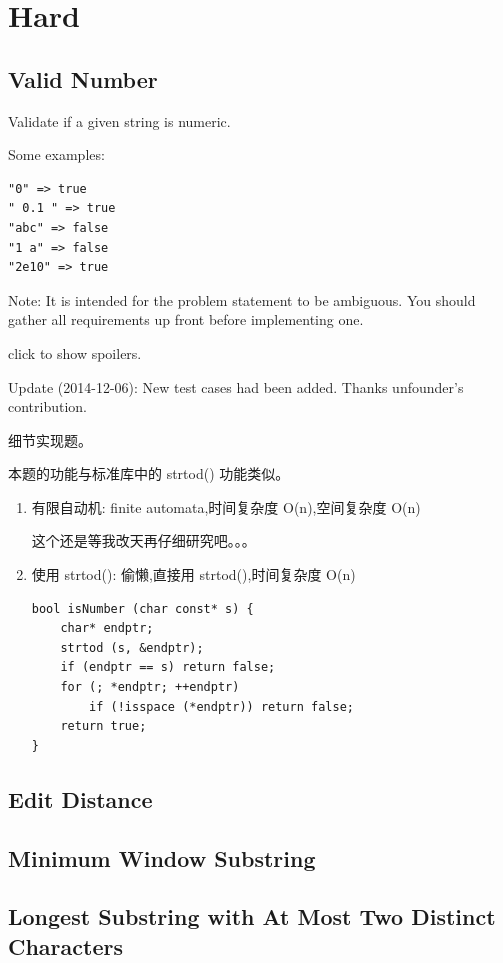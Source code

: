 \documentclass[12pt]{book}
\begin{document}
\section{Hard}
\label{sec-2-3}
\subsection{Valid Number}
\label{sec-2-3-1}
Validate if a given string is numeric.

Some examples:
\lstset{language=java,label= ,caption= ,numbers=none}
\begin{lstlisting}
"0" => true
" 0.1 " => true
"abc" => false
"1 a" => false
"2e10" => true
\end{lstlisting}

Note: It is intended for the problem statement to be ambiguous. You should gather all requirements up front before implementing one.

click to show spoilers.

Update (2014-12-06):
New test cases had been added. Thanks unfounder's contribution.

细节实现题。

本题的功能与标准库中的 strtod() 功能类似。

\begin{enumerate}
\item 有限自动机: finite automata,时间复杂度 O(n),空间复杂度 O(n)
\label{sec-2-3-1-1}

这个还是等我改天再仔细研究吧。。。

\item 使用 strtod(): 偷懒,直接用 strtod(),时间复杂度 O(n)
\label{sec-2-3-1-2}
\lstset{language=java,label= ,caption= ,numbers=none}
\begin{lstlisting}
bool isNumber (char const* s) {
    char* endptr;
    strtod (s, &endptr);
    if (endptr == s) return false;
    for (; *endptr; ++endptr)
        if (!isspace (*endptr)) return false;
    return true;
}
\end{lstlisting}
\end{enumerate}

\subsection{Edit Distance}
\label{sec-2-3-2}
\subsection{Minimum Window Substring}
\label{sec-2-3-3}
\subsection{Longest Substring with At Most Two Distinct Characters}
\label{sec-2-3-4}
\end{document}
